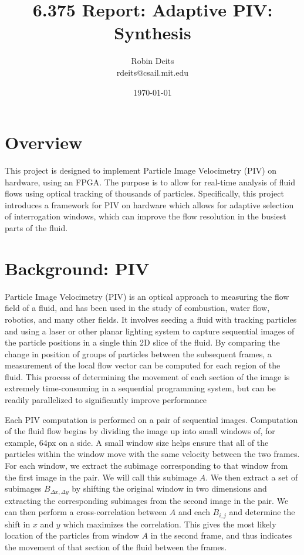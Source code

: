 \documentclass{article}
\begin{document}
	\author{Robin Deits\\ rdeits@csail.mit.edu}
	\title{6.375 Report: Adaptive PIV: Synthesis}
	\date{\today}
	\maketitle

	\tableofcontents

	\section{Overview}
	This project is designed to implement Particle Image Velocimetry (PIV) on hardware, using an FPGA. The purpose is to allow for real-time analysis of fluid flows using optical tracking of thousands of particles. Specifically, this project introduces a framework for PIV on hardware which allows for adaptive selection of interrogation windows, which can improve the flow resolution in the busiest parts of the fluid. 

	\section{Background: PIV} %
	\label{sec:background}
	Particle Image Velocimetry (PIV) is an optical approach to measuring the flow field of a fluid, and has been used in the study of combustion, water flow, robotics, and many other fields. It involves seeding a fluid with tracking particles and using a laser or other planar lighting system to capture sequential images of the particle positions in a single thin 2D slice of the fluid. By comparing the change in position of groups of particles between the subsequent frames, a measurement of the local flow vector can be computed for each region of the fluid. This process of determining the movement of each section of the image is extremely time-consuming in a sequential programming system, but can be readily parallelized to significantly improve performance \citep{Yu:2006tb}

	Each PIV computation is performed on a pair of sequential images. Computation of the fluid flow begins by dividing the image up into small windows of, for example, 64px on a side. A small window size helps ensure that all of the particles within the window move with the same velocity between the two frames. For each window, we extract the subimage corresponding to that window from the first image in the pair. We will call this subimage $A$. We then extract a set of subimages $B_{\Delta x,  \Delta y}$ by shifting the original window in two dimensions and extracting the corresponding subimages from the second image in the pair. We can then perform a cross-correlation between $A$ and each $B_{i, j}$ and determine the shift in $x$ and $y$ which maximizes the correlation. This gives the most likely location of the particles from window $A$ in the second frame, and thus indicates the movement of that section of the fluid between the frames.
\end{document}
